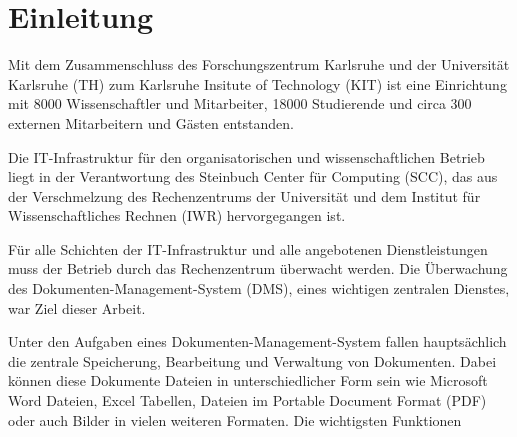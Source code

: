 \section{Einleitung}







Mit dem Zusammenschluss des Forschungszentrum Karlsruhe und der Universität Karlsruhe (TH) zum Karlsruhe Insitute of Technology (KIT) ist eine Einrichtung mit 8000 Wissenschaftler und Mitarbeiter, 18000 Studierende und circa 300 externen Mitarbeitern und Gästen entstanden.


Die IT-Infrastruktur für den organisatorischen und wissenschaftlichen Betrieb liegt in der Verantwortung des Steinbuch Center für Computing (SCC), das aus der Verschmelzung des Rechenzentrums der Universität und dem Institut für Wissenschaftliches Rechnen (IWR) hervorgegangen ist.

Für alle Schichten der IT-Infrastruktur und alle angebotenen Dienstleistungen muss der Betrieb durch das Rechenzentrum überwacht werden.
Die Überwachung des Dokumenten-Management-System (\gls{DMS}), eines wichtigen zentralen Dienstes, war Ziel dieser Arbeit.



Unter den Aufgaben eines Dokumenten-Management-System fallen hauptsächlich die zentrale Speicherung, Bearbeitung und Verwaltung von Dokumenten.
Dabei können diese Dokumente Dateien in unterschiedlicher Form sein wie Microsoft Word Dateien, Excel Tabellen, Dateien im Portable Document Format (\gls{PDF}) oder auch Bilder in vielen weiteren Formaten.
Die wichtigsten Funktionen

